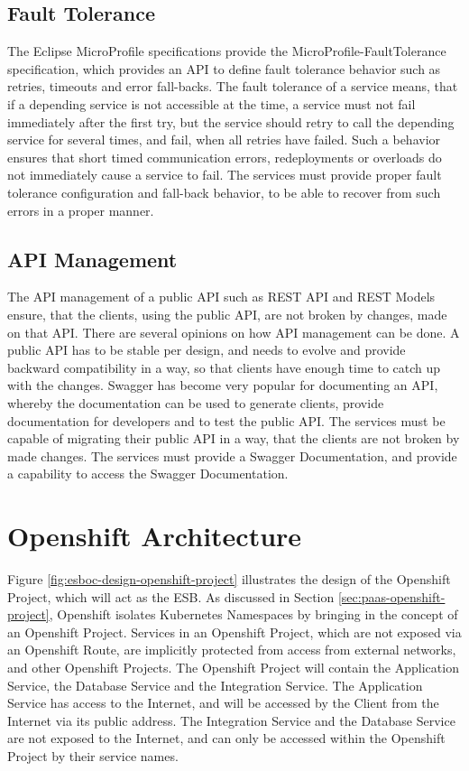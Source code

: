 \subsection{Fault Tolerance}
\label{sec:esboc-requirements-service-fault}
The Eclipse MicroProfile specifications provide the MicroProfile-FaultTolerance specification, which provides an API to define fault tolerance behavior such as retries, timeouts and error fall-backs. The fault tolerance of a service means, that if a depending service is not accessible at the time, a service must not fail immediately after the first try, but the service should retry to call the depending service for several times, and fail, when all retries have failed. Such a behavior ensures that short timed communication errors, redeployments or overloads do not immediately cause a service to fail. The services must provide proper fault tolerance configuration and fall-back behavior, to be able to recover from such errors in a proper manner\cite{EclipseMicroprofileFault2018}.   

\subsection{API Management}
\label{sec:esboc-requirements-service-api}
The API management of a public API such as REST API and REST Models ensure, that the clients, using the public API, are not broken by changes, made on that API. There are several opinions on how API management can be done. A public API has to be stable per design, and needs to evolve and provide backward compatibility in a way, so that clients have enough time to catch up with the changes. Swagger has become very popular for documenting an API, whereby the documentation can be used to generate clients, provide documentation for developers and to test the public API. The services must be capable of migrating their public API in a way, that the clients are not broken by made changes. The services must provide a Swagger Documentation, and provide a capability to access the Swagger Documentation\cite{SmartBearSwagger2018, RestVersion2018}.

\section{Openshift Architecture}
\label{sec:esboc-design-oc}
Figure \vref{fig:esboc-design-openshift-project} illustrates the design of the Openshift Project, which will act as the ESB. As discussed in Section \vref{sec:paas-openshift-project}, Openshift isolates Kubernetes Namespaces  by bringing in the concept of an Openshift Project. Services in an Openshift Project, which are not exposed via an Openshift Route, are implicitly protected from access from external networks, and other Openshift Projects. The Openshift Project will contain the Application Service, the Database Service and the Integration Service. The Application Service has access to the Internet, and will be accessed by the Client from the Internet via its public address. The Integration Service and the Database Service are not exposed to the Internet, and can only be accessed within the Openshift Project by their service names.


